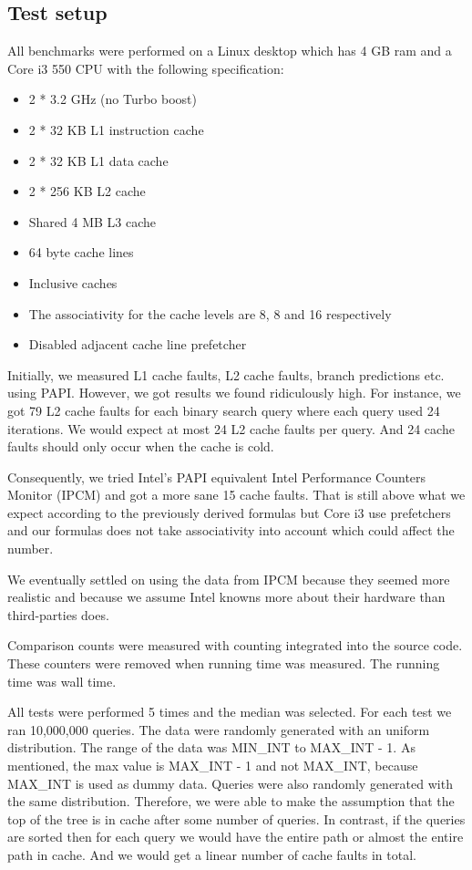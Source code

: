 \subsection{Test setup}

All benchmarks were performed on a Linux desktop which has 4 GB ram and a Core i3 550 CPU with the following specification:

\begin{itemize}
\item 2 * 3.2 GHz (no Turbo boost)
\item 2 * 32 KB L1 instruction cache
\item 2 * 32 KB L1 data cache
\item 2 * 256 KB L2 cache
\item Shared 4 MB L3 cache
\item 64 byte cache lines
\item Inclusive caches
\item The associativity for the cache levels are 8, 8 and 16 respectively
\item Disabled adjacent cache line prefetcher
\end{itemize}

Initially, we measured L1 cache faults, L2 cache faults, branch predictions etc. using PAPI. However, we got results we found ridiculously high.
For instance, we got 79 L2 cache faults for each binary search query where each query used 24 iterations.
We would expect at most 24 L2 cache faults per query. And 24 cache faults should only occur when the cache is cold.

Consequently, we tried Intel's PAPI equivalent Intel Performance Counters Monitor (IPCM) and got a more sane 15 cache faults.
That is still above what we expect according to the previously derived formulas but Core i3 use prefetchers and our formulas does not take associativity into account which could affect the number.

We eventually settled on using the data from IPCM because they seemed more realistic and because we
assume Intel knowns more about their hardware than third-parties does.

Comparison counts were measured with counting integrated into the source code. These counters were removed when running time was measured. The running time was wall time.

All tests were performed 5 times and the median was selected. For each test we ran 10,000,000 queries. The data were randomly generated with an uniform distribution. The range of the data was MIN\_INT to MAX\_INT - 1. As mentioned, the max value is MAX\_INT - 1 and not MAX\_INT, because MAX\_INT is used as dummy data. Queries were also randomly generated with the same distribution. Therefore, we were able to make the assumption that the top of the tree is in cache after some number of queries. In contrast, if the queries are sorted then for each query we would have the entire path or almost the entire path in cache. And we would get a linear number of cache faults in total.